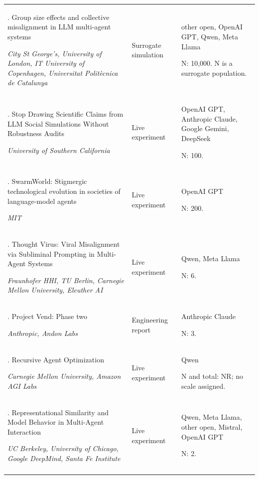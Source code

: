 \begin{longtable}{@{}>{\raggedright\arraybackslash}p{}>{\raggedright\arraybackslash}p{}>{\raggedright\arraybackslash}p{}@{}}
117. Group size effects and collective misalignment in LLM multi-agent systems \citep{prev-flint-group-size}\par\emph{City St George’s, University of London, IT University of Copenhagen, Universitat Politècnica de Catalunya} & Surrogate simulation & other open, OpenAI GPT, Qwen, Meta Llama\par N: 10,000. N is a surrogate population. \\ \addlinespace[2pt]
118. Stop Drawing Scientific Claims from LLM Social Simulations Without Robustness Audits \citep{prev-robustness-audits}\par\emph{University of Southern California} & Live experiment & OpenAI GPT, Anthropic Claude, Google Gemini, DeepSeek\par N: 100. \\ \addlinespace[2pt]
119. SwarmWorld: Stigmergic technological evolution in societies of language-model agents \citep{prev-swarmworld}\par\emph{MIT} & Live experiment & OpenAI GPT\par N: 200. \\ \addlinespace[2pt]
120. Thought Virus: Viral Misalignment via Subliminal Prompting in Multi-Agent Systems \citep{prev-thought-virus}\par\emph{Fraunhofer HHI, TU Berlin, Carnegie Mellon University, Eleuther AI} & Live experiment & Qwen, Meta Llama\par N: 6. \\ \addlinespace[2pt]
121. Project Vend: Phase two \citep{project-vend-2}\par\emph{Anthropic, Andon Labs} & Engineering report & Anthropic Claude\par N: 3. \\ \addlinespace[2pt]
122. Recursive Agent Optimization \citep{recursive-agent-optimization}\par\emph{Carnegie Mellon University, Amazon AGI Labs} & Live experiment & Qwen\par N and total: NR; no scale assigned. \\ \addlinespace[2pt]
123. Representational Similarity and Model Behavior in Multi-Agent Interaction \citep{representational-similarity}\par\emph{UC Berkeley, University of Chicago, Google DeepMind, Santa Fe Institute} & Live experiment & Qwen, Meta Llama, other open, Mistral, OpenAI GPT\par N: 2. \\ \addlinespace[2pt]

\end{longtable}
